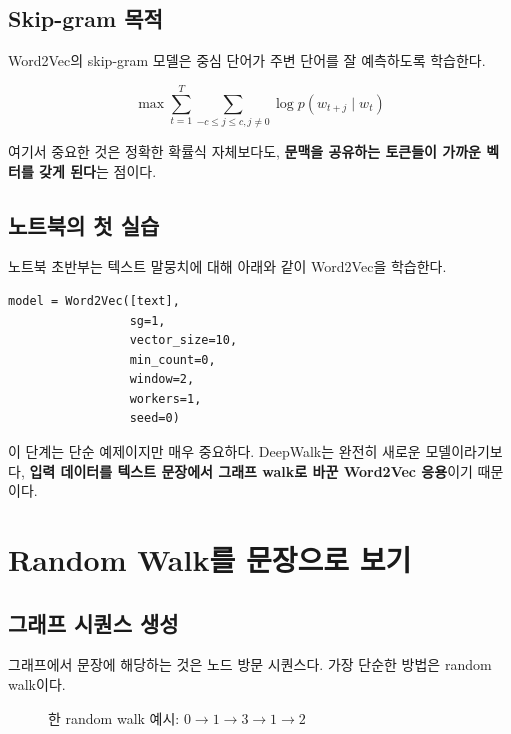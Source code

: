 \documentclass[11pt,a4paper]{article}
\begin{document}
\subsection{Skip-gram 목적}
Word2Vec의 skip-gram 모델은 중심 단어가 주변 단어를 잘 예측하도록 학습한다.

\[
\max \sum_{t=1}^{T} \sum_{-c \le j \le c, j \neq 0} \log p(w_{t+j}\mid w_t)
\]

여기서 중요한 것은 정확한 확률식 자체보다도, \textbf{문맥을 공유하는 토큰들이 가까운 벡터를 갖게 된다}는 점이다.

\subsection{노트북의 첫 실습}
노트북 초반부는 텍스트 말뭉치에 대해 아래와 같이 Word2Vec을 학습한다.

\begin{lstlisting}
model = Word2Vec([text],
                 sg=1,
                 vector_size=10,
                 min_count=0,
                 window=2,
                 workers=1,
                 seed=0)
\end{lstlisting}

이 단계는 단순 예제이지만 매우 중요하다. DeepWalk는 완전히 새로운 모델이라기보다, \textbf{입력 데이터를 텍스트 문장에서 그래프 walk로 바꾼 Word2Vec 응용}이기 때문이다.

\section{Random Walk를 문장으로 보기}

\subsection{그래프 시퀀스 생성}
그래프에서 문장에 해당하는 것은 노드 방문 시퀀스다. 가장 단순한 방법은 random walk이다.

\begin{figure}[h]
\centering
{}
\caption{한 random walk 예시: $0 \rightarrow 1 \rightarrow 3 \rightarrow 1 \rightarrow 2$}
\end{figure}
\end{document}
